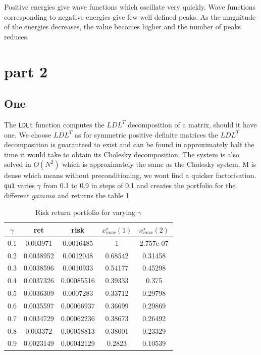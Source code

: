 \documentclass[paper=a4, fontsize=12pt]{scrartcl} %
\numberwithin{equation}{section}       %
\numberwithin{figure}{section}         %
\numberwithin{table}{section}          %
\begin{document}
\noindent Positive energies give wave functions which oscillate very quickly. Wave functions corresponding to negative energies give few well defined peaks. As the magnitude of the energies decreases, the value becomes higher and the number of peaks reduces. 

\newpage

\section{part 2}

\subsection{One} 
The \texttt{LDLt} function computes the $LDL^T$ decomposition of a matrix, should it have one. We choose $LDL^T$ as for symmetric positive definite matrices the $LDL^T$ decomposition is guaranteed to exist and can be found in approximately half the time it would take to obtain its Cholesky decomposition. The system is also solved in $O(N^2)$ which is approximately the same as the Cholesky system. M is dense which means without preconditioning, we wont find a quicker factorisation. \\
\texttt{qu1} varies $\gamma$ from 0.1 to 0.9 in steps of 0.1 and creates the portfolio for the different $gamma$ and returns the table \ref{table:2}

\begin{table}
	\begin{center}
		\begin{tabular}{c |c | c || c | c}
	
$\gamma$  & ret     &     risk  &         $x^{\star}_{max}(1)$ & $x^{\star}_{max}(2)$ \\
	\hline

 0.1 &    0.003971  &   0.0016485&          1&    2.757e-07\\
 0.2 &   0.0038952  &   0.0012048&    0.68542   &   0.31458\\
 0.3 &    0.0038596  &   0.0010933 &   0.54177    &  0.45298\\
 0.4 &    0.0037326  &  0.00085516  &  0.39333     &   0.375\\
 0.5 &    0.0036309  &   0.0007283   & 0.33712      & 0.29798\\
 0.6 &   0.0035597  &  0.00066937 &   0.36699      & 0.29869\\
 0.7 &   0.0034729  &  0.00062236 &   0.38673      & 0.26492\\
 0.8 &    0.003372  &  0.00058813 &   0.38001&      0.23329\\
 0.9 &   0.0023149  &  0.00042129 &    0.2823 &     0.10539\\

		
		\end{tabular}
	\end{center}
	\caption{Risk return portfolio for varying $\gamma$ }
	\label{table:2}
\end{table}
\end{document}
